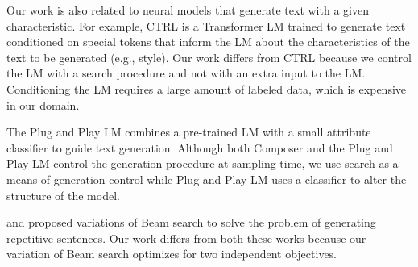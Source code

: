 Our work is also related
to neural models that generate text with a given characteristic.
For example, CTRL \cite{keskar2019ctrl} is a
Transformer LM trained to generate text conditioned on
special tokens that inform the LM about the characteristics of the text to be generated (e.g., style).
Our work differs
from CTRL because we control the LM with
a search procedure and not with an extra input to the LM. Conditioning the LM requires a large amount of labeled data, which is expensive
in our domain. %


The Plug and Play LM
\cite{dathathri2019plug} combines a pre-trained LM
with a small attribute classifier to guide text generation.
Although both Composer and the Plug and Play LM control the generation procedure at sampling time, we use search as a means of generation control while Plug and Play LM uses a classifier to alter the structure of the model. %


\cite{vijayakumar2018diverse} and \cite{Kool2019SBS} proposed variations of Beam search
to solve the problem of generating repetitive sentences.
Our work differs from both these works because our variation of Beam search optimizes for two independent objectives.
